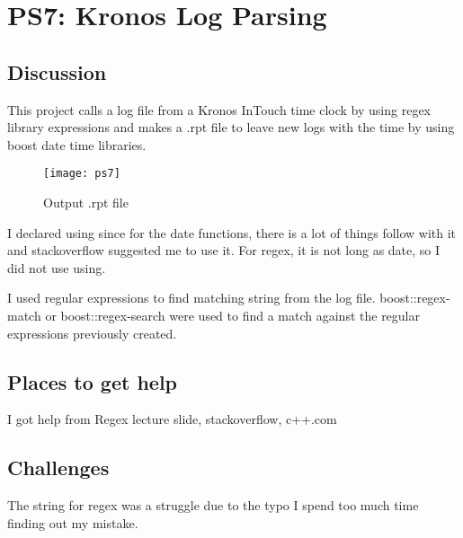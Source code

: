 \section{PS7: Kronos Log Parsing}\label{sec:ps7}

\subsection{Discussion}\label{sec:ps7:disc}

This project calls a log file from a Kronos InTouch time clock by using regex library expressions and makes a .rpt file to leave new logs with the time by using boost date time libraries.

\begin{figure}[tbh]
	\centering
	\texttt{[image: ps7]}
	\caption{Output .rpt file}
	\label{fig:ps7}
\end{figure}

I declared using since for the date functions, there is a lot of things follow with it and stackoverflow suggested me to use it. For regex, it is not long as date, so I did not use using.

I used regular expressions to find matching string from the log file.
boost::regex-match or boost::regex-search were used to find a match against the regular expressions previously created.

\subsection{Places to get help}
I got help from Regex lecture slide, stackoverflow, c++.com




\subsection{Challenges}\label{sec:ps7:challenges}
The string for regex was a struggle due to the typo I spend too much time finding out my mistake.


